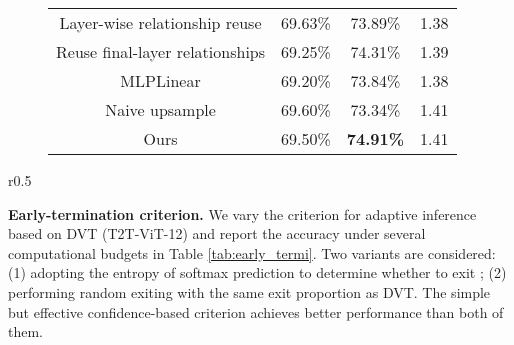 \documentclass{article}
\begin{document}
\begin{figure}[t]
\begin{center}
\begin{minipage}{0.515\columnwidth}
\begin{footnotesize}
{{\begin{tabular}{c|ccc}
Layer-wise relationship reuse& 69.63\% & 73.89\% & 1.38  \\
            Reuse final-layer relationships& 69.25\% & 74.31\% & 1.39  \\
            MLPLinear& 69.20\% & 73.84\% & 1.38  \\
            Naive upsample & 69.60\% & 73.34\% & 1.41  \\
\midrule
            Ours & 69.50\%   & \textbf{74.91\%} & {1.41} \\
            \bottomrule
        \end{tabular}}}
        \end{footnotesize}
        \end{minipage}
    \end{center}
    \vskip -0.2in
 \end{figure}


\begin{wraptable}{r}{0.5\columnwidth}
    \centering
\begin{footnotesize}
    \vskip -0.075in 
    \label{tab:early_termi}
    \end{footnotesize}
    \vskip -0.15in
\end{wraptable}
\textbf{Early-termination criterion.} 
We vary the criterion for adaptive inference based on DVT (T2T-ViT-12) and report the accuracy under several computational budgets in Table \ref{tab:early_termi}. Two variants are considered:
(1) adopting the entropy of softmax prediction to determine whether to exit \cite{teerapittayanon2016branchynet};
(2) performing random exiting with the same exit proportion as DVT.
The simple but effective confidence-based criterion achieves better performance than both of them.
\end{document}

